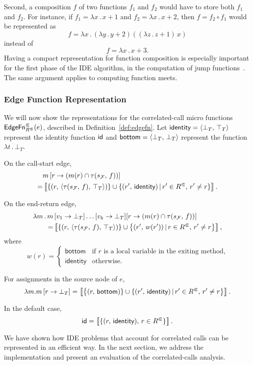 Second, a composition $f$ of two functions $f_1$ and $f_2$ would have to store both $f_1$ and $f_2$. For instance, if $f_1=\lambda x\,.\,x+1$ and $f_2=\lambda x\,.\,x+2$, then $f=f_2\circ f_1$ would be represented as 
\[
  f=\lambda x\,.\,(\lambda y\,.\,y+2)((\lambda z\,.\,z+1)\,x)
\]
instead of
\[
  f=\lambda x\,.\,x+3.
\]
Having a compact representation for function composition is especially important for the first phase of the IDE algorithm, in the computation of jump functions~\cite{sagiv1996precise}. The same argument applies to computing function meets.

\subsubsection{Edge Function Representation}  \label{sec:edgefnrep}
We will now show the representations for the correlated-call micro functions $\textsf{EdgeFn}^\Subset_{{R^\Subset}}(e)$, described in Definition~\ref{def:edgefn}. Let $\textsf{identity}=\left\langle \bot_T,\,\top_T\right\rangle$ represent the identity function $\textsf{id}$ and $\textsf{bottom}=\left\langle \bot_T,\,\bot_T\right\rangle$ represent the function $\lambda t\,.\,\bot_T$.

On the call-start edge,
\begin{align}
  &m\left[r\to (m(r)\cap\tau(s_\mathcal F,\,f))\right]\notag\\
  =&\left\llbracket\{(r,\,\langle\tau(s_\mathcal F,\,f),\,\top_T\rangle)\}
    \cup
    \{(r',\,\textsf{identity})\,|\,r'\in {R^\Subset},\,r'\ne r\}\right\rrbracket.
\end{align}

On the end-return edge,
\begin{align}
  \lambda m\,.\,m&\left[v_1\to\bot_T\right]\dots[v_k\to\bot_T][r\to (m(r)\cap\tau(s_\mathcal F,\,f))]\notag
  \\=&\left\llbracket
    \{(r,\,\langle\tau(s_\mathcal F,\,f),\,\top_T\rangle)\}
    \cup
    \left\{(r',\,w(r'))\,|\,r\in{R^\Subset},\,r'\ne r
  \right\}\right\rrbracket,
\end{align}
where
\[
w(r)=\begin{cases}
      \textsf{bottom}&\text{if $r$ is a local variable in the exiting method,}\\
      \textsf{identity}&\text{otherwise}.
    \end{cases}
\]

For assignments in the source node of $e$,
\begin{align}
  \lambda m.m\left[r\to \bot_T\right]
  =\left\llbracket\left\{(r,\,\textsf{bottom})\}
    \cup
    \{(r',\,\textsf{identity})\,|\,r'\in {R^\Subset},\,r'\ne r\right\}\right\rrbracket.
\end{align}%

In the default case,
\[
  \textsf{id}
  =\left\llbracket\{(r,\,\textsf{identity}),\,r\in {R^\Subset}\}\right\rrbracket.
\]

We have shown how IDE problems that account for correlated calls can be represented in an efficient way. In the next section, we address the implementation and present an evaluation of the correlated-calls analysis.
